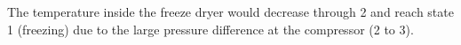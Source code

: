 The temperature inside the freeze dryer would decrease through 2 and reach state 1 (freezing) due to the large pressure difference at the compressor (2 to 3).